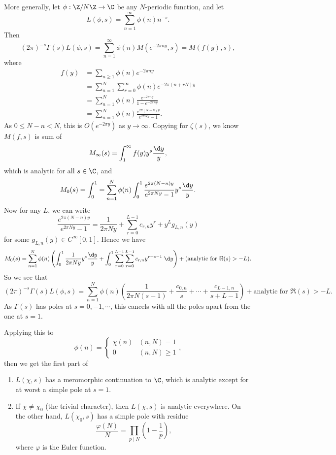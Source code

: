 \documentclass[a4paper]{article}
\begin{document}
More generally, let $\phi: \Z/N\Z \to \C$ be any $N$-periodic function, and let
\[
  L(\phi, s) = \sum_{n = 1}^\infty \phi(n) n^{-s}.
\]
Then
\[
  (2\pi)^{-s} \Gamma(s) L(\phi,s) = \sum_{n = 1}^\infty \phi(n) M(e^{-2\pi ny}, s) = M(f(y), s),
\]
where
\begin{align*}
  f(y) &= \sum_{n \geq 1} \phi(n) e^{-2\pi n y} \\
  &= \sum_{n = 1}^N \sum_{r = 0}^\infty \phi(n) e^{-2\pi (n + rN) y} \\
  &= \sum_{n = 1}^N \phi(n) \frac{e^{-2\pi n y}}{1 - e^{-2 \pi n y}} \\
  &= \sum_{n = 1}^N \phi(n) \frac{e^{2\pi (N - n) y}}{e^{2\pi Ny} - 1}.
\end{align*}
As $0 \leq N - n < N$, this is $O(e^{-2\pi y})$ as $y \to \infty$. Copying for $\zeta(s)$, we know $M(f, s)$ is sum of
\[
  M_\infty (s) = \int_1^\infty f(y) y^s \frac{\d y}{y},
\]
which is analytic for all $s \in \C$, and
\[
  M_0(s) = \int_0^1 = \sum_{n = 1}^N \phi(n) \int_0^1 \frac{e^{2\pi (N -n) y}}{ e^{2\pi Ny} - 1} y^s \frac{\d y}{y}.
\]
Now for any $L$, we can write
\[
  \frac{e^{2\pi (N - n) y}}{e^{2\pi Ny} - 1} = \frac{1}{2 \pi N y} + \sum_{r = 0}^{L - 1} c_{r, n} y^r + y^L g_{L, n}(y)
\]
for some $g_{L, n}(y) \in C^\infty[0, 1]$. Hence we have
\[
  M_0(s) = \sum_{n = 1}^N \phi(n) \left(\int_0^1 \frac{1}{2\pi N y} y^s \frac{\d y}{y} + \int_0^1 \sum_{r = 0}^{L - 1}\sum_{r = 0}^{L - 1} c_{r, n} y^{r + s - 1} \;\d y\right) + (\text{analytic for $\Re(s) > -L$}).
\]
So we see that
\[
  (2\pi)^{-s} \Gamma(s) L(\phi, s) = \sum_{n = 1}^N \phi(n) \left(\frac{1}{2\pi N(s - 1)} + \frac{c_{0, n}}{s} + \cdots + \frac{c_{L - 1, n}}{s + L - 1}\right) + \text{analytic for $\Re(s) > -L$}.
\]
As $\Gamma(s)$ has poles at $s = 0, -1, \cdots$, this cancels with all the poles apart from the one at $s = 1$.

Applying this to
\[
  \phi(n) =
  \begin{cases}
    \chi(n)  & (n, N) = 1\\
    0 & (n, N) \geq 1
  \end{cases},
\]
then we get the first part of
\begin{thm}\leavevmode
  \begin{enumerate}
    \item $L(\chi, s)$ has a meromorphic continuation to $\C$, which is analytic except for at worst a simple pole at $s = 1$.
    \item If $\chi \not= \chi_0$ (the trivial character), then $L(\chi, s)$ is analytic everywhere. On the other hand, $L(\chi_0, s)$ has a simple pole with residue
      \[
        \frac{\varphi(N)}{N} = \prod_{p \mid N} \left(1 - \frac{1}{p}\right),
      \]
      where $\varphi$ is the Euler function.
  \end{enumerate}
\end{thm}
\end{document}
